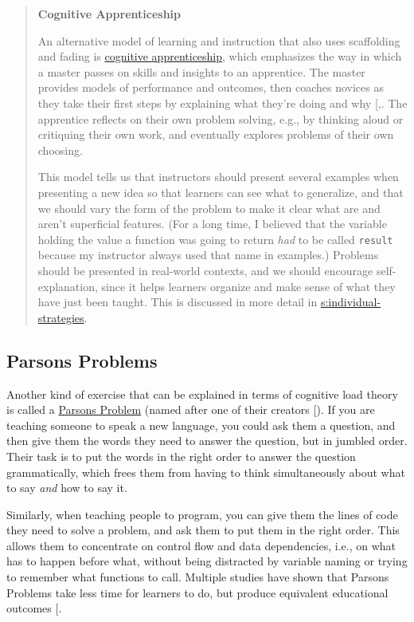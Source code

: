 \begin{quote}\setlength{\parindent}{0pt}
\textbf{Cognitive Apprenticeship}

An alternative model of learning and instruction that also uses
scaffolding and fading is
\protect\hyperlink{g:cognitive-apprenticeship}{cognitive apprenticeship},
which emphasizes the way in which a master passes on skills and
insights to an apprentice. The master provides models of performance
and outcomes, then coaches novices as they take their first steps by
explaining what they're doing and why {[},\protect[\hyperlink{b:Casp2007}{Casp2007}]{]}. The
apprentice reflects on their own problem solving, e.g., by thinking
aloud or critiquing their own work, and eventually explores problems
of their own choosing.

This model tells us that instructors should present several examples
when presenting a new idea so that learners can see what to
generalize, and that we should vary the form of the problem to make it
clear what are and aren't superficial features. (For a long time, I
believed that the variable holding the value a function was going to
return \emph{had} to be called \texttt{result} because my instructor always used
that name in examples.) Problems should be presented in real-world
contexts, and we should encourage self-explanation, since it helps
learners organize and make sense of what they have just been taught.
This is discussed in more detail in
\protect\hyperlink{SECTION}{s:individual-strategies}.
\end{quote}

\subsection{Parsons Problems}\label{parsons-problems}

Another kind of exercise that can be explained in terms of cognitive
load theory is called a \protect\hyperlink{g:parsons-problem}{Parsons Problem}
(named after one of their creators {[}\protect[\hyperlink{b:Pars2006}{Pars2006}]{]}). If you are
teaching someone to speak a new language, you could ask them a question,
and then give them the words they need to answer the question, but in
jumbled order. Their task is to put the words in the right order to
answer the question grammatically, which frees them from having to think
simultaneously about what to say \emph{and} how to say it.

Similarly, when teaching people to program, you can give them the lines
of code they need to solve a problem, and ask them to put them in the
right order. This allows them to concentrate on control flow and data
dependencies, i.e., on what has to happen before what, without being
distracted by variable naming or trying to remember what functions to
call. Multiple studies have shown that Parsons Problems take less time
for learners to do, but produce equivalent educational outcomes
{[}\protect[\hyperlink{b:Eric2017}{Eric2017}]{]}.

